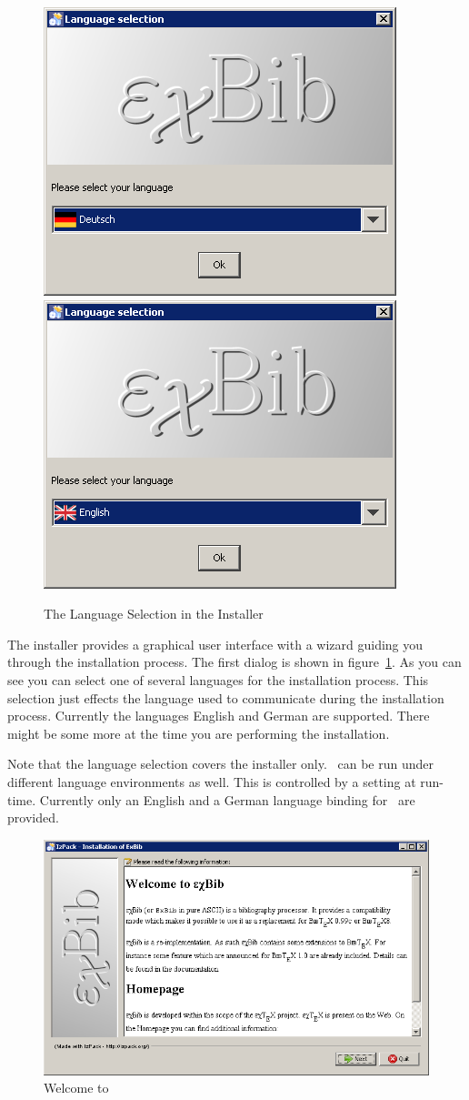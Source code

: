 \begin{figure}[!ht]
  \centering
  \includegraphics[width=.45\textwidth]{img/inst1}\hfill
  \includegraphics[width=.45\textwidth]{img/inst2}
  \caption{The Language Selection in the Installer}
  \label{fig:inst1}
\end{figure}
The installer provides a graphical user interface with a wizard
guiding you through the installation process. The first dialog is
shown in figure~\ref{fig:inst1}. As you can see you can select one of
several languages for the installation process. This selection just
effects the language used to communicate during the installation
process.  Currently the languages English and German are supported.
There might be some more at the time you are performing the
installation.

Note that the language selection covers the installer only. \ExBib\ 
can be run under different language environments as well. This is
controlled by a setting at run-time. Currently only an English and
a German language binding for \ExBib\ are provided.\index{language}

\begin{figure}[!ht]
  \centering
  \includegraphics[width=.45\textwidth]{img/inst3}
  \caption{Welcome to \ExBib}
  \label{fig:inst2}
\end{figure}

